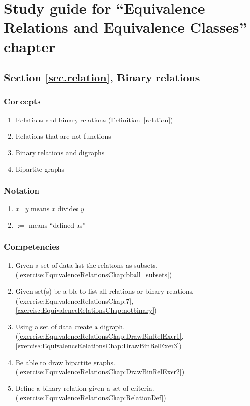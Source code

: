 \section{Study guide  for ``Equivalence Relations and Equivalence Classes''  chapter} \label{sec:EquivalenceRelationsChap:study} 
\subsection*{Section \ref{sec.relation}, Binary relations}
\subsubsection*{Concepts}
\begin{enumerate}
\item 
Relations and binary relations (Definition~\ref{relation})
\item
Relations that are not functions
\item
Binary relations and digraphs
\item
Bipartite graphs
\end{enumerate}

\subsubsection*{Notation}
\begin{enumerate}
\item
 $x\mid y$ means $x$ divides $y$
\item 
$:=$ means ``defined as''
\end{enumerate}

\subsubsection*{Competencies}
\begin{enumerate}
\item
Given a set of data list the relations as subsets.  (\ref{exercise:EquivalenceRelationsChap:bball_subsets}) 
\item
Given set(s) be a ble to list all relations or binary relations. (\ref{exercise:EquivalenceRelationsChap:7}, \ref{exercise:EquivalenceRelationsChap:notbinary})
\item	
Using a set of data create a digraph. (\ref{exercise:EquivalenceRelationsChap:DrawBinRelExer1}, \ref{exercise:EquivalenceRelationsChap:DrawBinRelExer3})
\item
Be able to draw bipartite graphs. (\ref{exercise:EquivalenceRelationsChap:DrawBinRelExer2})
\item
Define a binary relation given a set of criteria. (\ref{exercise:EquivalenceRelationsChap:RelationDef})
\end{enumerate}


